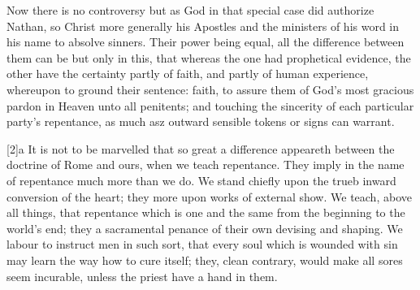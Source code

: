 Now there is no controversy but as God in that special case did authorize Nathan, so Christ more generally his Apostles and the ministers of his word in his name to absolve sinners. Their power being equal, all the difference between them can be but only in this, that whereas the one had prophetical evidence, the other have the certainty partly of faith, and partly of human experience, whereupon to ground their sentence: faith, to assure them of God’s most gracious pardon in Heaven unto all penitents; and touching the sincerity of each particular party’s repentance, as much asz outward sensible tokens or signs can warrant.

[2]a It is not to be marvelled that so great a difference appeareth between the doctrine of Rome and ours, when we teach repentance. They imply in the name of repentance much more than we do. We stand chiefly upon the trueb inward conversion of the heart; they more upon works of external show. We teach, above all things, that repentance which is one and the same from the beginning to the world’s  end; they a sacramental penance of their own devising and shaping. We labour to instruct men in such sort, that every soul which is wounded with sin may learn the way how to cure itself; they, clean contrary, would make all sores seem incurable, unless the priest have a hand in them.

